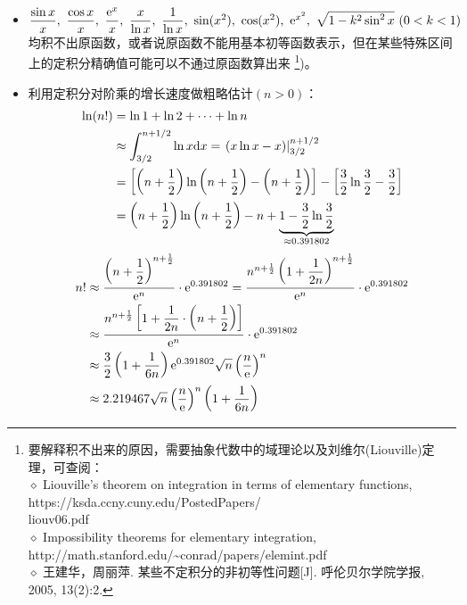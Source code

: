 \begin{itemize}[leftmargin=\inteval{\myitemleftmargin}pt,itemsep=
   \inteval{\myitemitempsep}pt,topsep=\inteval{\myitemtopsep}pt]
\item $ \dfrac{\sin x}{x},\ \dfrac{\cos x}{x},\ \dfrac{\e^x}{x},\ 
\dfrac{x}{\ln x},\ \dfrac{1}{\ln x},\ \sin(x^2),\ \cos(x^2),\ 
\e^{x^2},\ \sqrt{1-k^2\sin^2 x}\ (0<k<1) $均积不出原函数，或者说原函数不能用基本初等函数表示，但在某些特殊区间上的定积分精确值可能可以不通过原函数算出来
\footnote{要解释积不出来的原因，需要抽象代数中的域理论以及刘维尔(Liouville)定理，可查阅：\\
$ \diamond $ Liouville's theorem on integration in terms of elementary functions,\quad 
https://ksda.ccny.cuny.edu/PostedPapers/\\liouv06.pdf \\
$ \diamond $ Impossibility theorems for elementary integration,
\quad http://math.stanford.edu/\textasciitilde conrad/papers/elemint.pdf \\
$ \diamond $ 王建华，周丽萍. 某些不定积分的非初等性问题[J]. 
呼伦贝尔学院学报, 2005, 13(2):2.})。

\item 利用定积分对阶乘的增长速度做粗略估计$(n>0)$：
\begin{align*}
    \ln(n!) &=\ln 1+\ln 2+ \cdots +\ln n  \\
    &\approx \int_{3/2}^{n+1/2} \ln x\mathrm{d} x  
    =\left.(x\ln x - x)\right|_{3/2}^{n+1/2} \\
    &= \left[\left(n+\dfrac{1}{2}\right)
    \ln \left(n+\dfrac{1}{2}\right)-\left(n+\dfrac{1}{2}\right)\right]
    -\left[\dfrac{3}{2}\ln \dfrac{3}{2}-\dfrac{3}{2} \right] \\
    &=\left(n+\dfrac{1}{2}\right) \ln \left(n+\dfrac{1}{2}\right)
    -n+\underbrace{1-\dfrac{3}{2}\ln \dfrac{3}{2}}_{\approx 0.391802 }
\end{align*} 
\begin{align}
    n! &\approx \dfrac{\left(n+\dfrac{1}{2}\right)^
        {n+\frac{1}{2}}}{\mathrm{e}^n} \cdot \mathrm{e}^{0.391802}
    = \dfrac{n^{{n+\frac{1}{2}}} \left(1+\dfrac{1}{2n}\right)^
        {n+\frac{1}{2}}}{\mathrm{e}^n} \cdot \mathrm{e}^{0.391802} \nonumber\\ 
    &\approx \dfrac{n^{{n+\frac{1}{2}}} \left[1+\dfrac{1}{2n}
        \cdot\left(n+\dfrac{1}{2}\right)\right]}{\mathrm{e}^n}\cdot \mathrm{e}^{0.391802}
    \nonumber \\
    &\approx \dfrac{3}{2}\left(1+\dfrac{1}{6n}\right)\mathrm{e}^{0.391802}\sqrt{n}
    \left(\dfrac{n}{\mathrm{e}}\right)^n \\
    & \approx 2.219467\sqrt{n}\left(\dfrac{n}{\mathrm{e}}\right)^n
    \left(1+\dfrac{1}{6n}\right) \label{积分估计阶乘-系数2.219}
\end{align}


\end{itemize}
